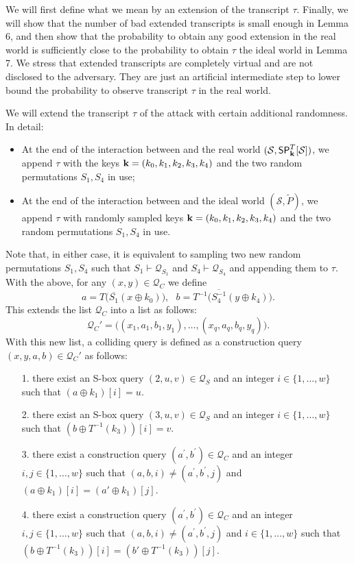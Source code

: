 We will first define what we mean by an extension of the transcript $\tau$. Finally, we will show that the number of bad extended transcripts is small enough in Lemma 6, and then show that the probability to obtain any good extension in the real world is sufficiently close to the probability to obtain $\tau$ the ideal world in Lemma 7. We stress that extended transcripts are completely virtual and are not disclosed to the adversary. They are just an artificial intermediate step to lower bound the probability to observe transcript $\tau$ in the real world.


We will extend the transcript $\tau$ of the attack with certain additional randomness. In detail:
\begin{itemize}
	\item At the end of the interaction between \dis and the real world $(\mathcal{S},\mathsf{SP}_{\mathbf{k}}^T[\mathcal{S}])$, we append $\tau$ with the keys $\mathbf{k}=(k_0,k_1,k_2,k_3,k_4)$ and the two random permutations $S_1,S_4$ in use;
	\item At the end of the interaction between \dis and the ideal world $(\mathcal{S},\widetilde{P})$, we append $\tau$ with randomly sampled keys $\mathbf{k}=(k_0,k_1,k_2,k_3,k_4)$ and the two random permutations $S_1,S_4$ in use.
\end{itemize}
Note that, in either case, it is equivalent to sampling two new random permutations $S_1,S_4$ such that $S_1\vdash\mathcal{Q}_{S_{1}}$ and $S_4\vdash\mathcal{Q}_{S_4}$ and appending them to $\tau$. With the above, for any $(x,y)\in\mathcal{Q}_C$ we define
%
$$a=T\big(\overline{S_1}\left(x \oplus k_{0}\right)\big),\ \ \  b=T^{-1}\big(\overline{S_{4}^{-1}}\left(y \oplus k_{4}\right)\big).$$
%
This extends the list $\mathcal{Q}_C$ into a list as follows:
%
$$\mathcal{Q}_C'=\big((x_1,a_1,b_1,y_1),\ldots,(x_q,a_q,b_q,y_q)\big).$$
%
With this new list, a colliding query is defined as a construction query $(x,y,a,b)\in\mathcal{Q}_C'$ as follows:
%
\begin{itemize}
	\item[1.]
	there exist an S-box query $(2, u, v) \in \mathcal{Q}_{S}$ and an integer $i \in\{1, \ldots, w\}$ such that $\left(a \oplus k_1\right)[i]=u$.
	\item[2.]
	there exist an S-box query $(3, u, v) \in \mathcal{Q}_{S}$ and an integer $i \in\{1, \ldots, w\}$ such that $\left(b \oplus T^{-1}(k_3)\right)[i]=v$.
	\item[3.] there exist a construction query $\left(a^{\prime}, b^{\prime}\right) \in \mathcal{Q}_{C}$ and an integer $i,j \in\{1, \ldots, w\}$ such that $(a, b, i) \neq\left(a^{\prime}, b^{\prime}, j\right)$ and $\left(a \oplus k_1\right)[i] = \left(a' \oplus k_1\right)[j]$.
	\item[4.] there exist a construction query $\left(a^{\prime}, b^{\prime}\right) \in \mathcal{Q}_{C}$ and an integer $i,j \in\{1, \ldots, w\}$ such that $(a, b, i) \neq\left(a^{\prime}, b^{\prime}, j\right)$ and $i \in\{1, \ldots, w\}$ such that $\left(b \oplus T^{-1}(k_3)\right)[i] = \left(b' \oplus T^{-1}(k_3)\right)[j]$.
\end{itemize}
